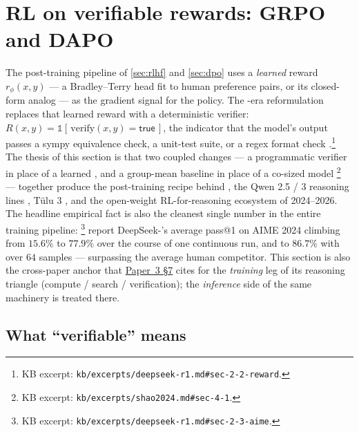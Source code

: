 
\section{RL on verifiable rewards: GRPO and DAPO}
\label{sec:rlvr-grpo}
\label{sec:rlvr-frontier}

The post-training pipeline of \cref{sec:rlhf} and \cref{sec:dpo} uses a
\emph{learned} reward $r_\phi(x, y)$ — a Bradley--Terry head fit to
human preference pairs, or its  closed-form analog — as the gradient
signal for the policy. The -era reformulation replaces that learned
reward with a deterministic verifier: $R(x, y) = \mathbb{1}[\,\mathrm{verify}(x, y) = \mathsf{true}\,]$,
the indicator that the model's output passes a sympy equivalence check,
a unit-test suite, or a regex format check
\citep[\S 2.2]{deepseek-r1}.\footnote{KB excerpt:
\texttt{kb/excerpts/deepseek-r1.md\#sec-2-2-reward}.} The thesis of this
section is that two coupled changes — a programmatic verifier in place
of a learned , and a group-mean baseline in place of a
co-sized  model \citep[\S 4.1]{shao2024}\footnote{KB excerpt:
\texttt{kb/excerpts/shao2024.md\#sec-4-1}.} — together produce the
post-training recipe behind \citet{deepseek-r1}, the Qwen 2.5 / 3
reasoning lines \citep{qwen3}, T\"ulu 3 \citep{tulu3}, and the
open-weight RL-for-reasoning ecosystem of 2024--2026. The headline
empirical fact is also the cleanest single number in the entire training
pipeline: \citet[\S 2.3]{deepseek-r1}\footnote{KB excerpt:
\texttt{kb/excerpts/deepseek-r1.md\#sec-2-3-aime}.} report
DeepSeek-'s average pass@1 on AIME 2024 climbing from
$15.6\%$ to $77.9\%$ over the course of one continuous  run, and to
$86.7\%$ with  over $64$ samples — surpassing the
average human competitor. This section is also the cross-paper anchor
that \hyperref[P3-sec:rlvr-grpo-dapo]{Paper~3 §7} cites for the \emph{training} leg of its reasoning
triangle (compute / search / verification); the \emph{inference} side of
the same machinery is treated there.

\subsection{What ``verifiable'' means}
\label{sec:rlvr-verifiable}

